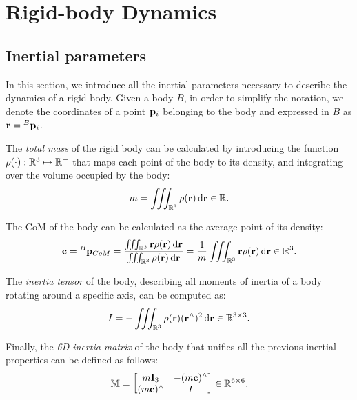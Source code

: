\section{Rigid-body Dynamics}

\subsection{Inertial parameters}

In this section, we introduce all the inertial parameters necessary to describe the dynamics of a rigid body.
Given a body $B$, in order to simplify the notation, we denote the coordinates of a point $\pos_i$ belonging to the body and expressed in $B$ as $\mathbf{r} = \pos[B]_i$.

The \emph{total mass} of the rigid body can be calculated by introducing the function $\rho(\cdot): \realn^3 \mapsto \realn^+$ that maps each point of the body to its density, and integrating over the volume occupied by the body:
%
\begin{equation*}
    m = \iiint_{\realn^3} \rho(\mathbf{r}) \dd{\mathbf{r}}
    \in \realn
    .
\end{equation*}

The \ac{CoM} of the body can be calculated as the average point of its density:
%
\begin{equation}
    \label{eq:com_definition}
    \mathbf{c} = \pos[B]_{CoM} =
    \frac{\iiint_{\realn^3} \mathbf{r} \rho(\mathbf{r}) \dd{\mathbf{r}}}{\iiint_{\realn^3} \rho(\mathbf{r}) \dd{\mathbf{r}}}
    = \frac{1}{m} \iiint_{\realn^3} \mathbf{r} \rho(\mathbf{r}) \dd{\mathbf{r}}
    \in \realn^3
    .
\end{equation}

The \emph{inertia tensor} of the body, describing all moments of inertia of a body rotating around a specific axis, can be computed as:
%
\begin{equation*}
   I = -\iiint_{\realn^3} \rho(\mathbf{r}) (\mathbf{r}^\wedge)^2 \dd{\mathbf{r}}
   \in \realn^{3\times3}
   .
\end{equation*}

Finally, the \emph{6D inertia matrix} of the body that unifies all the previous inertial properties can be defined as follows:
%
\begin{equation*}
   \masssix =
   \begin{bmatrix}
       m \eye_3 & -(m\mathbf{c})^\wedge \\
       (m\mathbf{c})^\wedge & I
   \end{bmatrix}
   \in \realn^{6\times6}
   .
\end{equation*}

